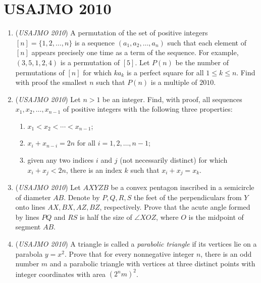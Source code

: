 \section{USAJMO 2010}
        \begin{enumerate}
        	\item (\textit{USAJMO 2010}) A permutation of the set of positive integers $[n] = \{1, 2, \ldots, n\}$ is a sequence $(a_1, a_2, \ldots, a_n)$ such that each element of $[n]$ appears precisely one time as a term of the sequence. For example, $(3, 5, 1, 2, 4)$ is a permutation of $[5]$. Let $P(n)$ be the number of permutations of $[n]$ for which $ka_k$ is a perfect square for all $1\leq k\leq n$. Find with proof the smallest $n$ such that $P(n)$ is a multiple of $2010$.


 

	\item (\textit{USAJMO 2010}) Let $n > 1$ be an integer. Find, with proof, all sequences $x_1, x_2, \ldots, x_{n-1}$ of positive integers with the following three properties:


 
            \begin{enumerate}

        \item  $x_1 < x_2 < \cdots < x_{n-1}$;

        \item  $x_i + x_{n-i} = 2n$ for all $i = 1, 2, \ldots, n - 1$;

        \item  given any two indices $i$ and $j$ (not necessarily distinct) for which $x_i + x_j < 2n$, there is an index $k$ such that $x_i + x_j = x_k$.

            \end{enumerate}
            

	\item (\textit{USAJMO 2010}) Let $AXYZB$ be a convex pentagon inscribed in a semicircle of diameter $AB$. Denote by $P, Q, R, S$ the feet of the perpendiculars from $Y$ onto lines $AX, BX, AZ, BZ$, respectively. Prove that the acute angle formed by lines $PQ$ and $RS$ is half the size of $\angle XOZ$, where $O$ is the midpoint of segment $AB$.


 

	\item (\textit{USAJMO 2010}) A triangle is called a \textit{parabolic triangle} if its vertices lie on a parabola $y = x^2$. Prove that for every nonnegative integer $n$, there is an odd number $m$ and a parabolic triangle with vertices at three distinct points with integer coordinates with area $(2^nm)^2$.



\end{enumerate}
